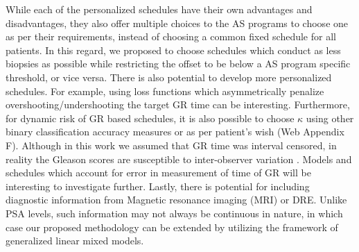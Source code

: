 While each of the personalized schedules have their own advantages and disadvantages, they also offer multiple choices to the AS programs to choose one as per their requirements, instead of choosing a common fixed schedule for all patients. In this regard, we proposed to choose schedules which conduct as less biopsies as possible while restricting the offset to be below a AS program specific threshold, or vice versa. There is also potential to develop more personalized schedules. For example, using loss functions which asymmetrically penalize overshooting/undershooting the target GR time can be interesting. Furthermore, for dynamic risk of GR based schedules, it is also possible to choose $\kappa$ using other binary classification accuracy measures or as per patient's wish (Web Appendix F). Although in this work we assumed that GR time was interval censored, in reality the Gleason scores are susceptible to inter-observer variation \citep{Gleason_interobs_var}. Models and schedules which account for error in measurement of time of GR will be interesting to investigate further. Lastly, there is potential for including diagnostic information from Magnetic resonance imaging (MRI) or DRE. Unlike PSA levels, such information may not always be continuous in nature, in which case our proposed methodology can be extended by utilizing the framework of generalized linear mixed models.